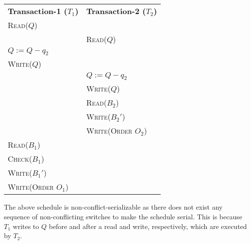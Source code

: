 \begin{center}
    \begin{adjustbox}{width=\textwidth}
        \begin{tabularx}{\textwidth}{|X|X|}
        \hline
        \multirow{2}{*}{\textbf{Transaction-1 ($T_{1}$)}} & \multirow{2}{*}{\textbf{Transaction-2 ($T_{2}$)}} \\
        & \\ \hline
        \textsc{Read($Q$)} & \\
        & \textsc{Read($Q$)} \\
        \textsc{$Q := Q - q_{2}$} & \\
        \textsc{Write($Q$)} & \\
        & \textsc{$Q := Q - q_{2}$} \\
        & \textsc{Write($Q$)} \\
        & \textsc{Read($B_{2}$)} \\
        & \textsc{Write($B_{2}'$)} \\
        & \textsc{Write(Order $O_{2}$)} \\
        \textsc{Read($B_{1}$)} & \\
        \textsc{Check($B_{1}$)} & \\
        \textsc{Write($B_{1}'$)} & \\
        \textsc{Write(Order $O_{1}$)} & \\
        \hline
        \end{tabularx}
    \end{adjustbox}
\end{center}
\vspace*{10pt}
The above schedule is non-conflict-serializable as there does not exist any sequence of non-conflicting switches
to make the schedule serial. This is because $T_{1}$ writes to $Q$ before and after a read and write,
respectively, which are executed by $T_{2}$.